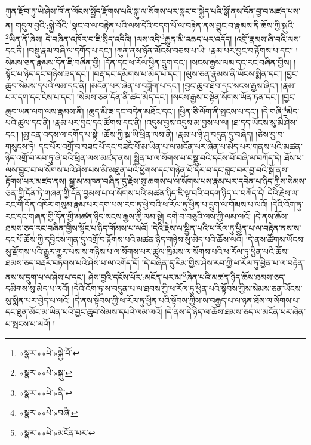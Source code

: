 ཀུན་རྫོབ་ཏུ་ཡེ་ཤེས་ཁོ་ན་ལོངས་སྤྱོད་རྫོགས་པའི་སྐུ་ལ་སོགས་པར་སྣང་བ་སྐྱེད་པའི་སྒོ་ནས་དོན་བྱ་བ་མཛད་པས་ན། གདུལ་བྱའི་:སྐྱེ་བོའི་\footnote{«སྣར་»«པེ་»སྐྱེ་བོ་}སྣང་བ་ལ་བརྟེན་པའི་ལས་དེའི་བདག་པོ་ལ་བརྟེན་ནས་བྱུང་བ་རྣམས་ནི་ཆོས་ཀྱི་སྐུའི་\footnote{«སྣར་»«པེ་»སྐུ་}ཡིན་ནོ་ཞེས། དེ་བཞིན་འཁོར་བ་ཇི་སྲིད་འདིའི། །ལས་འདི་\footnote{«སྣར་»«པེ་»ནི་}རྒྱུན་མི་འཆད་པར་འདོད། །འགྲོ་རྣམས་ཞི་བའི་ལས་དང་ནི། །བསྡུ་རྣམ་བཞི་ལ་དགོད་པ་དང་། །ཀུན་ནས་ཉོན་མོངས་བཅས་པ་ཡི། །རྣམ་པར་བྱང་བ་རྟོགས་པ་དང་། །སེམས་ཅན་རྣམས་དོན་ཇི་བཞིན་གྱི། །དོན་དང་ཕ་རོལ་ཕྱིན་དྲུག་དང་། །སངས་རྒྱས་ལམ་དང་རང་བཞིན་གྱིས། །སྟོང་པ་ཉིད་དང་གཉིས་ཟད་དང་། །བརྡ་དང་དམིགས་པ་མེད་པ་དང་། །ལུས་ཅན་རྣམས་ནི་ཡོངས་སྨིན་དང་། །བྱང་ཆུབ་སེམས་དཔའི་ལམ་དང་ནི། །མངོན་པར་ཞེན་པ་བཟློག་པ་དང་། །བྱང་ཆུབ་ཐོབ་དང་སངས་རྒྱས་ཞིང་། །རྣམ་པར་དག་དང་ངེས་པ་དང་། །སེམས་ཅན་དོན་ནི་ཚད་མེད་དང་། །སངས་རྒྱས་བསྟེན་སོགས་ཡོན་ཏན་དང་། །བྱང་ཆུབ་ཡན་ལག་ལས་རྣམས་ནི། །ཆུད་མི་ཟ་དང་བདེན་མཐོང་དང་། །ཕྱིན་ཅི་ལོག་ནི་སྤངས་པ་དང་། །དེ་གཞི་\footnote{«སྣར་»«པེ་»བཞི་}མེད་པའི་ཚུལ་དང་ནི། །རྣམ་པར་བྱང་དང་ཚོགས་དང་ནི། །འདུས་བྱས་འདུས་མ་བྱས་པ་ལ། །ཐ་དད་ཡོངས་སུ་མི་ཤེས་དང་། །མྱ་ངན་འདས་ལ་དགོད་པ་སྟེ། །ཆོས་ཀྱི་སྐུ་ཡི་ཕྲིན་ལས་ནི། །རྣམ་པ་ཉི་ཤུ་བདུན་དུ་བཞེད། །ཅེས་བྱ་བ་གསུངས་ཏེ། དང་པོར་འགྲོ་བ་བཟང་པོ་དང་བཟང་པོ་མ་ཡིན་པ་ལ་མངོན་པར་ཞེན་པ་མེད་པར་གནས་པའི་མཚན་ཉིད་འགྲོ་བ་རབ་ཏུ་ཞི་བའི་ཕྲིན་ལས་མཛད་ནས། སྦྱིན་པ་ལ་སོགས་པ་བསྡུ་བའི་དངོས་པོ་བཞི་ལ་བཀོད་དེ། ཐོས་པ་ལས་བྱུང་བ་ལ་སོགས་པའི་ཤེས་པས་མི་མཐུན་པའི་ཕྱོགས་དང་གཉེན་པོ་དོར་བ་དང་བླང་བར་བྱ་བའི་སྒོ་ནས་རྟོགས་པར་མཛད་ནས། སྒྱུ་མ་མཁན་བཞིན་དུ་རྗེས་སུ་ཆགས་པ་ལ་སོགས་པས་རྣམ་པར་དབེན་པ་ཉིད་ཀྱིས་སེམས་ཅན་གྱི་དོན་ཏེ་གཞན་གྱི་དོན་བྱམས་པ་ལ་སོགས་པའི་མཚན་ཉིད་ཇི་ལྟ་བའི་བདག་ཉིད་ལ་བཀོད་དེ། དེའི་རྗེས་ལ་རང་གི་དོན་འཁོར་གསུམ་རྣམ་པར་དག་པས་རབ་ཏུ་ཕྱེ་བའི་ཕ་རོལ་ཏུ་ཕྱིན་པ་དྲུག་ལ་གོམས་པ་ལའོ། །དེའི་འོག་ཏུ་རང་དང་གཞན་གྱི་དོན་གྱི་མཚན་ཉིད་སངས་རྒྱས་ཀྱི་ལམ་སྟེ། དགེ་བ་བཅུའི་ལས་ཀྱི་ལམ་ལའོ། །དེ་ནས་ཆོས་ཐམས་ཅད་རང་བཞིན་གྱིས་སྟོང་པ་ཉིད་གོམས་པ་ལའོ། །དེའི་རྗེས་ལ་སྦྱིན་པའི་ཕ་རོལ་ཏུ་ཕྱིན་པ་ལ་བརྟེན་ནས་ས་དང་པོ་ཆོས་ཀྱི་དབྱིངས་ཀུན་དུ་འགྲོ་བ་རྟོགས་པའི་མཚན་ཉིད་གཉིས་སུ་མེད་པའི་ཆོས་ལའོ། །དེ་ནས་ཚོགས་ཡོངས་སུ་རྫོགས་པའི་རྒྱུར་གྱུར་པས་ས་གཉིས་པ་ལ་སོགས་པར་ཚུལ་ཁྲིམས་ལ་སོགས་པའི་ཕ་རོལ་ཏུ་ཕྱིན་པའི་ཆོས་ཐམས་ཅད་བརྡར་བཏགས་པའི་ཤེས་པ་ལ་འགོད་དོ། །དེ་བཞིན་དུ་རིམ་གྱིས་ཤེས་རབ་ཀྱི་ཕ་རོལ་ཏུ་ཕྱིན་པ་ལ་བརྟེན་ནས་ས་དྲུག་པ་ལ་ཤེས་པ་དང་། ཤེས་བྱའི་དངོས་པོར་:མངོན་པར་མ་\footnote{«སྣར་»«པེ་»མངོན་པར་}ཞེན་པའི་མཚན་ཉིད་ཆོས་ཐམས་ཅད་དམིགས་སུ་མེད་པ་ལའོ། །དེའི་འོག་ཏུ་ས་བདུན་པ་ལ་ཐབས་ཀྱི་ཕ་རོལ་ཏུ་ཕྱིན་པའི་སྟོབས་ཀྱིས་སེམས་ཅན་ཡོངས་སུ་སྨིན་པར་བྱེད་པ་ལའོ། །དེ་ནས་སྟོབས་ཀྱི་ཕ་རོལ་ཏུ་ཕྱིན་པའི་སྟོབས་ཀྱིས་ས་བརྒྱད་པ་ལ་ཉན་ཐོས་ལ་སོགས་པ་དང་ཐུན་མོང་མ་ཡིན་པའི་བྱང་ཆུབ་སེམས་དཔའི་ལམ་ལའོ། །དེ་ནས་དེ་ཉིད་ལ་ཆོས་ཐམས་ཅད་ལ་མངོན་པར་ཞེན་པ་སྤངས་པ་ལའོ། །
